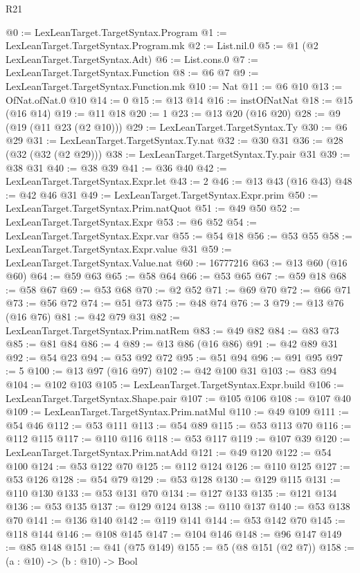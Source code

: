 \begin{lexlean}{R21}
\begin{coremodule}
@0 := LexLeanTarget.TargetSyntax.Program
@1 := LexLeanTarget.TargetSyntax.Program.mk
@2 := List.nil.{0}
@5 := @1 (@2 LexLeanTarget.TargetSyntax.Adt)
@6 := List.cons.{0}
@7 := LexLeanTarget.TargetSyntax.Function
@8 := @6 @7
@9 := LexLeanTarget.TargetSyntax.Function.mk
@10 := Nat
@11 := @6 @10
@13 := OfNat.ofNat.{0} @10
@14 := 0
@15 := @13 @14
@16 := instOfNatNat
@18 := @15 (@16 @14)
@19 := @11 @18
@20 := 1
@23 := @13 @20 (@16 @20)
@28 := @9 (@19 (@11 @23 (@2 @10)))
@29 := LexLeanTarget.TargetSyntax.Ty
@30 := @6 @29
@31 := LexLeanTarget.TargetSyntax.Ty.nat
@32 := @30 @31
@36 := @28 (@32 (@32 (@2 @29)))
@38 := LexLeanTarget.TargetSyntax.Ty.pair @31
@39 := @38 @31
@40 := @38 @39
@41 := @36 @40
@42 := LexLeanTarget.TargetSyntax.Expr.let
@43 := 2
@46 := @13 @43 (@16 @43)
@48 := @42 @46 @31
@49 := LexLeanTarget.TargetSyntax.Expr.prim
@50 := LexLeanTarget.TargetSyntax.Prim.natQuot
@51 := @49 @50
@52 := LexLeanTarget.TargetSyntax.Expr
@53 := @6 @52
@54 := LexLeanTarget.TargetSyntax.Expr.var
@55 := @54 @18
@56 := @53 @55
@58 := LexLeanTarget.TargetSyntax.Expr.value @31
@59 := LexLeanTarget.TargetSyntax.Value.nat
@60 := 16777216
@63 := @13 @60 (@16 @60)
@64 := @59 @63
@65 := @58 @64
@66 := @53 @65
@67 := @59 @18
@68 := @58 @67
@69 := @53 @68
@70 := @2 @52
@71 := @69 @70
@72 := @66 @71
@73 := @56 @72
@74 := @51 @73
@75 := @48 @74
@76 := 3
@79 := @13 @76 (@16 @76)
@81 := @42 @79 @31
@82 := LexLeanTarget.TargetSyntax.Prim.natRem
@83 := @49 @82
@84 := @83 @73
@85 := @81 @84
@86 := 4
@89 := @13 @86 (@16 @86)
@91 := @42 @89 @31
@92 := @54 @23
@94 := @53 @92 @72
@95 := @51 @94
@96 := @91 @95
@97 := 5
@100 := @13 @97 (@16 @97)
@102 := @42 @100 @31
@103 := @83 @94
@104 := @102 @103
@105 := LexLeanTarget.TargetSyntax.Expr.build
@106 := LexLeanTarget.TargetSyntax.Shape.pair
@107 := @105 @106
@108 := @107 @40
@109 := LexLeanTarget.TargetSyntax.Prim.natMul
@110 := @49 @109
@111 := @54 @46
@112 := @53 @111
@113 := @54 @89
@115 := @53 @113 @70
@116 := @112 @115
@117 := @110 @116
@118 := @53 @117
@119 := @107 @39
@120 := LexLeanTarget.TargetSyntax.Prim.natAdd
@121 := @49 @120
@122 := @54 @100
@124 := @53 @122 @70
@125 := @112 @124
@126 := @110 @125
@127 := @53 @126
@128 := @54 @79
@129 := @53 @128
@130 := @129 @115
@131 := @110 @130
@133 := @53 @131 @70
@134 := @127 @133
@135 := @121 @134
@136 := @53 @135
@137 := @129 @124
@138 := @110 @137
@140 := @53 @138 @70
@141 := @136 @140
@142 := @119 @141
@144 := @53 @142 @70
@145 := @118 @144
@146 := @108 @145
@147 := @104 @146
@148 := @96 @147
@149 := @85 @148
@151 := @41 (@75 @149)
@155 := @5 (@8 @151 (@2 @7))
@158 := (a : @10) -> (b : @10) -> Bool

\end{coremodule}
\end{lexlean}
